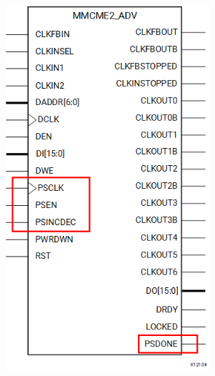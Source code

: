 \documentclass[compress,10pt,aspectratio=169]{beamer}
\begin{document}
\begin{frame}[fragile]
\begin{minipage}{.25\linewidth}
    \includegraphics[width=\linewidth]{mmcm.png}
  \end{minipage}
\end{frame}
\end{document}
